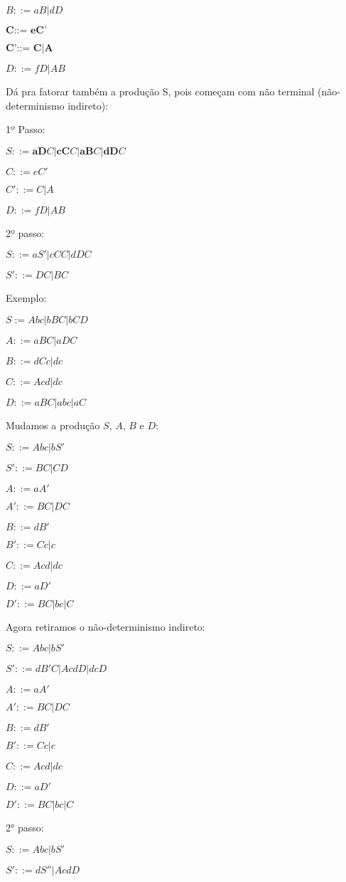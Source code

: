 \documentclass[]{article}
\begin{document}
	$B::= aB|dD$
	
	$\textbf{C::= eC'}$
	
	$\textbf{C'::= C|A}$
	
	$D::= fD|AB$
	
	Dá pra fatorar também a produção S, pois começam com não terminal (não-determinismo indireto):

	1º Passo:
		
	$S::= \textbf{aD}C| \textbf{cC}C | \textbf{aB}C | \textbf{dD}C$
	
	$C::= eC'$
	
	$C'::= C | A$
	
	$D::= fD|AB$
	
	2º passo:
	
	$S::= aS' | cCC | dDC$
	
	$S'::= DC | BC$	
	
	Exemplo:
	
	$S:= Abc | bBC | bCD$
	
	$A::= aBC |aDC$
	
	$B::=dCc|dc$
	
	$C::= Acd |dc$
	
	$D::= aBC | abc | aC$

	Mudamos a produção $S$, $A$, $B$ e $D$:
	
	$S::= Abc | bS'$

	$S'::=BC | CD$	
	
	$A ::= aA'$
	
	$A'::= BC |DC$
	
	$B::= dB'$
	
	$B'::=Cc|c$
	
	$C::= Acd |dc$
	
	$D::= aD'$
	
	$D'::= BC | bc | C$
	
	Agora retiramos o não-determinismo indireto:

	$S::= Abc | bS'$

	$S'::=dB'C | AcdD | dcD$	
	
	$A ::= aA'$
	
	$A'::= BC |DC$
	
	$B::= dB'$
	
	$B'::=Cc|c$
	
	$C::= Acd |dc$
	
	$D::= aD'$
	
	$D'::= BC | bc | C$
		
	2° passo:
	
	$S::= Abc | bS'$

	$S'::=dS'' | AcdD$	
	
\end{document}
